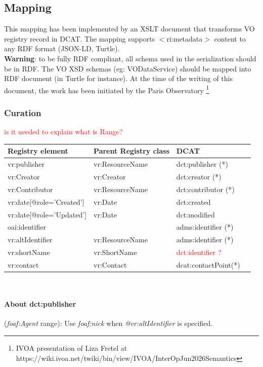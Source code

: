 \documentclass[11pt,a4paper]{ivoa}
\begin{document}
\subsection{Mapping}

This mapping has been implemented by an XSLT document that transforms VO registry record in DCAT.   
The mapping supports $<$ri:metadata$>$ content to any RDF format (JSON-LD, Turtle).\\


\textbf{Warning}: to be fully RDF compliant, all schema used in the serialization should be in RDF. The VO XSD schemas (eg: VODataService) should be mapped into RDF document (in Turtle for instance).
At the time of the writing of this document, the work has been initiated by the Paris Observatory \footnote{IVOA presentation of Liza Fretel at https://wiki.ivoa.net/twiki/bin/view/IVOA/InterOpJun2026Semantics}

\subsubsection{Curation}

\textcolor{red}{is it needed to explain what is Range?}\\
\begin{tabular}{|l|l|l|l|} \hline
	\textbf{Registry element} & \textbf{Parent Registry class} & \textbf{DCAT}  \\ \hline
	vr:publisher &  vr:ResourceName & dct:publisher (*)  \\ \hline 
	vr:Creator & vr:Creator & dct:creator (*) \\ \hline 
	vr:Contributor & vr:ResourceName & dct:contributor (*) \\ \hline 
	vr:date[@role='Created'] & vr:Date& dct:created \\ \hline
	vr:date[@role='Updated'] & vr:Date& dct:modified \\ \hline
    oai:identifier & & adms:identifier (*)\\ \hline
    vr:altIdentifier & vr:ResourceName & adms:identifier (*) \\ \hline
    vr:shortName & vr:ShortName & \textcolor{red}{dct:identifier ?}\\ \hline
    vr:contact & vr:Contact & dcat:contactPoint(*)\\ \hline
    
\end{tabular}\\

\paragraph{About dct:publisher} (\textit{foaf:Agent} range): Use \textit{foaf:nick} when \textit{@vr:altIdentifier} is specified.
\end{document}
